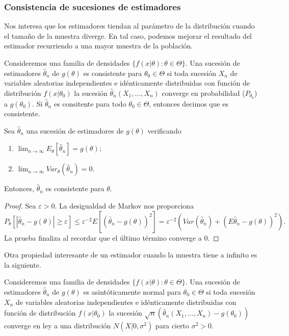 \documentclass{article}
\begin{document}
    \subsubsection{Consistencia de sucesiones de estimadores}

    Nos interesa que los estimadores tiendan al parámetro de la distribución cuando el tamaño de la muestra diverge. En tal caso, podemos mejorar el resultado del estimador recurriendo a una mayor muestra de la población.

    \begin{definition}
        Consideremos una familia de densidades $\{f(x | \theta) : \theta \in \Theta\}$. Una sucesión de estimadores $\hat\theta_n$ de $g(\theta)$ es consistente para $\theta_0 \in \Theta$ si toda sucesión $X_n$ de variables aleatorias independientes e idénticamente distribuidas con función de distribución $f(x | \theta_0)$ la sucesión $\hat\theta_n(X_1, \ldots, X_n)$ converge en probabilidad ($P_{\theta_0}$) a $g(\theta_0)$. Si $\hat\theta_n$ es consitente para todo $\theta_0 \in \Theta$, entonces decimos que es consistente.
    \end{definition}

    \begin{thm}
        Sea $\hat\theta_n$ una sucesión de estimadores de $g(\theta)$ verificando
        \begin{enumerate}
            \item $\lim_{n \to \infty} E_\theta[\hat\theta_n] = g(\theta)$;
            \item $\lim_{n \to \infty} Var_\theta(\hat\theta_n) = 0$.
        \end{enumerate}
        Entonces, $\hat\theta_n$ es consistente para $\theta$.
    \end{thm}
    \begin{proof}
        Sea $\varepsilon > 0$. La desigualdad de Markov nos proporciona
        \[P_\theta[|\hat\theta_n - g(\theta)| \ge \varepsilon] \le \varepsilon^{-2} E[(\hat\theta_n - g(\theta))^2] = \varepsilon^{-2}  \left(Var(\hat\theta_n) + (E\hat\theta_n -g(\theta))^2\right).\]
        La prueba finaliza al recordar que el último término converge a $0$.
    \end{proof}

    Otra propiedad interesante de un estimador cuando la muestra tiene a infinito es la siguiente.

    \begin{definition}
        Consideremos una familia de densidades $\{f(x | \theta) : \theta \in \Theta\}$. Una sucesión de estimadores $\hat\theta_n$ de $g(\theta)$ es asintóticamente normal para $\theta_0 \in \Theta$ si toda sucesión $X_n$ de variables aleatorias independientes e idénticamente distribuidas con función de distribución $f(x | \theta_0)$ la sucesión $\sqrt{n}(\hat\theta_n(X_1, \ldots, X_n) - g(\theta_0))$ converge en ley a una distribución $N(X|0,\sigma^2)$ para cierto $\sigma^2 > 0$.
    \end{definition}
\end{document}
